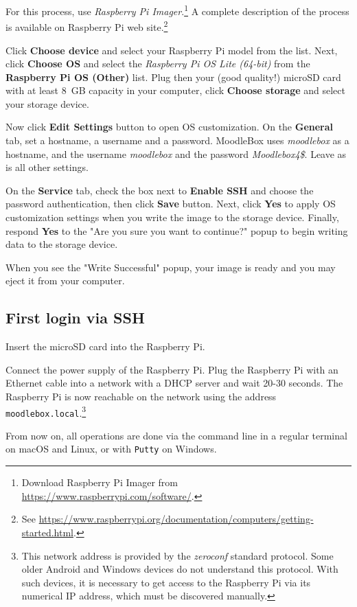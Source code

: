 \documentclass[12pt]{article}
\begin{document}
For this process, use \textsl{Raspberry Pi Imager}.\footnote{Download Raspberry Pi Imager from \url{https://www.raspberrypi.com/software/}.}
A complete description of the process is available on Raspberry Pi web site.\footnote{See \url{https://www.raspberrypi.org/documentation/computers/getting-started.html}.}

Click \textbf{Choose device} and select your Raspberry Pi model from the list.
Next, click \textbf{Choose OS} and select the \emph{Raspberry Pi OS Lite (64-bit)} from the \textbf{Raspberry Pi OS (Other)} list.
Plug then your (good quality!) microSD card with at least 8~GB capacity in your computer, click \textbf{Choose storage} and select your storage device.

Now click \textbf{Edit Settings} button to open OS customization.
On the \textbf{General} tab, set a hostname, a username and a password.
MoodleBox uses \emph{moodlebox} as a hostname, and the username \emph{moodlebox} and the password \emph{Moodlebox4\$}.
Leave as is all other settings.\label{page-credentials}

On the \textbf{Service} tab, check the box next to \textbf{Enable SSH} and choose the password authentication, then click \textbf{Save} button.
Next, click \textbf{Yes} to apply OS customization settings when you write the image to the storage device.
Finally, respond \textbf{Yes} to the "Are you sure you want to continue?" popup to begin writing data to the storage device.

When you see the "Write Successful" popup, your image is ready and you may eject it from your computer.

\subsection{First login via SSH}

Insert the microSD card into the Raspberry Pi.

Connect the power supply of the Raspberry Pi.
Plug the Raspberry Pi with an Ethernet cable into a network with a DHCP server and wait 20-30 seconds.
The Raspberry Pi is now reachable on the network using the address \lstinline{moodlebox.local}.\footnote{This network address is provided by the \emph{zeroconf} standard protocol.
Some older Android and Windows devices do not understand this protocol.
With such devices, it is necessary to get access to the Raspberry Pi via its numerical IP address, which must be discovered manually.}

From now on, all operations are done via the command line in a regular terminal on macOS and Linux, or with \lstinline{Putty} on Windows.
\end{document}
